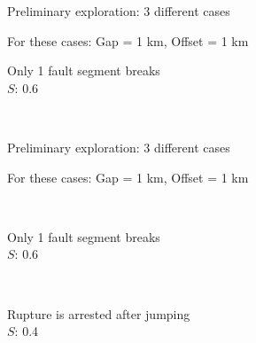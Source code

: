 \documentclass{beamer}
\begin{document}
\begin{frame}
 {Preliminary exploration: 3 different cases}

 \begin{center}
 For these cases: Gap = 1 km, Offset = 1 km \\
 \vskip 0.4cm
 \begin{minipage}{0.45\linewidth}
    \centering \small Only 1 fault segment breaks \\
    $S$: 0.6
 \end{minipage} \quad 
 \begin{minipage}{0.45\linewidth}
  \quad \hfill \quad
 \end{minipage} \\
 \begin{minipage}{0.45\linewidth}
  \quad \hfill \quad
  \end{minipage}
 \end{center}
 
\end{frame}


\begin{frame}
 {Preliminary exploration: 3 different cases}

 \begin{center}
 For these cases: Gap = 1 km, Offset = 1 km \\
 \vskip 0.4cm
 \begin{minipage}{0.45\linewidth}
 \end{minipage} \
  \begin{minipage}{0.45\linewidth}
    \centering \small Only 1 fault segment breaks \\
  	$S$: 0.6
 \end{minipage} \,
   \begin{minipage}{0.45\linewidth}
    \centering \small Rupture is arrested after jumping \\
  	$S$: 0.4
 \end{minipage} \\
 \begin{minipage}{0.45\linewidth}
  \quad \hfill \quad
 \end{minipage}
 \end{center}
 \addtocounter{framenumber}{-1}
  
\end{frame}
\end{document}
